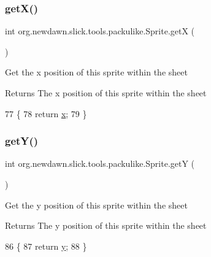 \subsubsection{\texorpdfstring{get\+X()}{getX()}}
{\footnotesize\ttfamily int org.\+newdawn.\+slick.\+tools.\+packulike.\+Sprite.\+getX (\begin{DoxyParamCaption}{ }\end{DoxyParamCaption})\hspace{0.3cm}{\ttfamily [inline]}}

Get the x position of this sprite within the sheet

\begin{DoxyReturn}{Returns}
The x position of this sprite within the sheet 
\end{DoxyReturn}

\begin{DoxyCode}
77                       \{
78         \textcolor{keywordflow}{return} \mbox{\hyperlink{classorg_1_1newdawn_1_1slick_1_1tools_1_1packulike_1_1_sprite_a9bd0b6392ca72a997c8bbd9631fb6dab}{x}};
79     \}
\end{DoxyCode}
\mbox{\label{classorg_1_1newdawn_1_1slick_1_1tools_1_1packulike_1_1_sprite_ae418a8002a72f73525e4a516d6ad84d4}} 
\subsubsection{\texorpdfstring{get\+Y()}{getY()}}
{\footnotesize\ttfamily int org.\+newdawn.\+slick.\+tools.\+packulike.\+Sprite.\+getY (\begin{DoxyParamCaption}{ }\end{DoxyParamCaption})\hspace{0.3cm}{\ttfamily [inline]}}

Get the y position of this sprite within the sheet

\begin{DoxyReturn}{Returns}
The y position of this sprite within the sheet 
\end{DoxyReturn}

\begin{DoxyCode}
86                       \{
87         \textcolor{keywordflow}{return} \mbox{\hyperlink{classorg_1_1newdawn_1_1slick_1_1tools_1_1packulike_1_1_sprite_a513b034525fe70842f69ff900ab3783a}{y}};
88     \}
\end{DoxyCode}
\mbox{\label{classorg_1_1newdawn_1_1slick_1_1tools_1_1packulike_1_1_sprite_a98b73bd8d5d4b8be846dba03956c2806}} 

